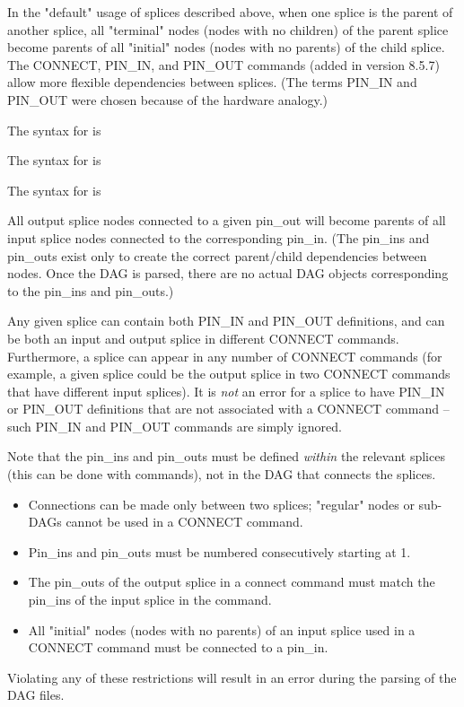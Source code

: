 In the "default" usage of splices described above, when one splice is
the parent of another splice, all "terminal" nodes (nodes with no
children) of the parent splice become parents of all "initial" nodes
(nodes with no parents) of the child splice.  The CONNECT,
PIN\_IN, and PIN\_OUT commands (added in version 8.5.7) allow more
flexible dependencies between splices.  (The terms PIN\_IN and PIN\_OUT
were chosen because of the hardware analogy.)

The syntax for  is

  

The syntax for  is

  

The syntax for  is

  

All output splice nodes connected to a given pin\_out will become
parents of all input splice nodes connected to the corresponding
pin\_in.  (The pin\_ins and pin\_outs exist only to create the
correct parent/child dependencies between nodes.  Once the
DAG is parsed, there are no actual DAG objects corresponding
to the pin\_ins and pin\_outs.)

Any given splice can contain both PIN\_IN and PIN\_OUT definitions,
and can be both an input and output splice in different CONNECT
commands.  Furthermore, a splice can appear in any number of
CONNECT commands (for example, a given splice could be the output
splice in two CONNECT commands that have different input splices).
It is \emph{not} an error for a splice to have PIN\_IN or PIN\_OUT
definitions that are not associated with a CONNECT command -- such
PIN\_IN and PIN\_OUT commands are simply ignored.

Note that the pin\_ins and pin\_outs must be defined \emph{within}
the relevant splices (this can be done with  commands), not
in the DAG that connects the splices.


\begin{itemize}
\item Connections can be made only between two splices; "regular"
nodes or sub-DAGs cannot be used in a CONNECT command.
\item Pin\_ins and pin\_outs must be numbered consecutively starting
at 1.
\item The pin\_outs of the output splice in a connect command must
match the pin\_ins of the input splice in the command.
\item All "initial" nodes (nodes with no parents) of an input splice
used in a CONNECT command must be connected to a pin\_in.
\end{itemize}
Violating any of these restrictions will result in an error during
the parsing of the DAG files.

